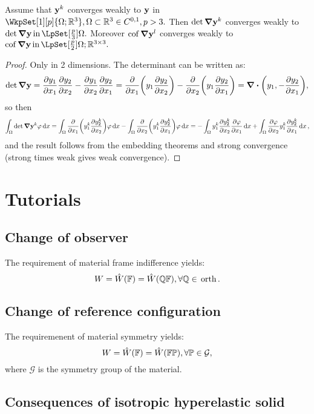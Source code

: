 \documentclass[reqno, a4paper]{article}
\begin{document}
\begin{theorem}[Magic]
	Assume that $\vb{y}^k$ converges weakly to $\vb{y}$ in $\WkpSet[1][p]{\Omega;\R^3}, \Omega \subset \R^3 \in C^{0,1}, p>3.$ Then $\det \grad \vb{y}^k$ converges weakly to $\det \grad \vb{y} \, \text{in} \, \LpSet[\frac{p}{3}]{\Omega}.$ Moreover $\operatorname{cof} \grad \vb{y}^l$ converges weakly to $\cof \grad \vb{y} \, \text{in} \, \LpSet[\frac{p}{2}]{\Omega;\R^{3 \times 3}}.$
\end{theorem}

\begin{proof}
	Only in 2 dimensions. The determinant can be written as:
	\[
		\det \grad \vb{y} = \pdv{y_1}{x_1}\pdv{y_2}{x_2}-\pdv{y_1}{x_2}\pdv{y_2}{x_1} = \pdv{x_1}\qty(y_1 \pdv{y_2}{x_2})-\pdv{x_2}\qty(y_1 \pdv{y_2}{x_1}) = \divergence{\qty(y_1,-\pdv{y_2}{x_1})},
	\]
	so then
	\[
		\int_{\Omega}\det \grad \vb{y}^k \varphi \dd{x} = \int_{\Omega}\pdv{x_1} \qty(y^k_1 \pdv{y_2^k}{x_2})\varphi\dd{x} - \int_{\Omega}\pdv{x_2}\qty(y^k_1 \pdv{y^k_2}{x_1})\varphi\dd{x} = -\int_{\Omega}y_1^k \pdv{y_2^k}{x_2}\pdv{\varphi}{x_1} \dd{x} + \int_{\Omega}\pdv{\varphi}{x_2} y_1^k \pdv{y_2^k}{x_1}\dd{x},
	\]
	and the result follows from the embedding theorems and strong convergence (strong times weak gives weak convergence).
\end{proof}
\section{Tutorials}
\label{sec:tutorials}


\subsection{Change of observer}
\label{sec:chobserver}

The requirement of material frame indifference yields:
\[
	W = \hat{W}\qty(\mathbb{F}) = \hat{W}\qty(\mathbb{Q}\mathbb{F}), \forall \mathbb{Q} \in \, \text{orth} \,.
\]

\subsection{Change of reference configuration}
\label{sec:chreference}
The requiremenent of material symmetry yields:
\[
	W= \hat{W}\qty(\mathbb{F})= \hat{W}\qty(\mathbb{F} \mathbb{P}), \forall \mathbb{P} \in \mathcal{G},
\]
where $\mathcal{G}$ is the symmetry group of the material.

\subsection{Consequences of isotropic hyperelastic solid}
\label{sec:conshypelisosolid}
\end{document}
